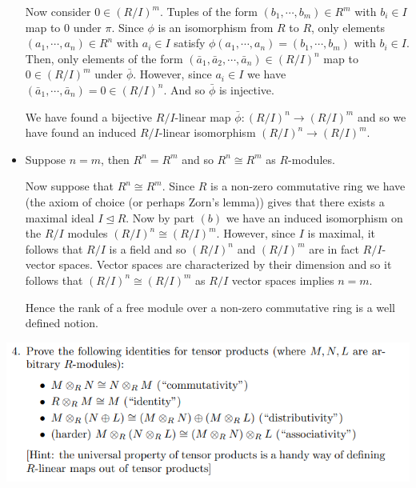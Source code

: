 \documentclass[12pt,letterpaper,boxed]{hmcpset}
\newcommand{\normal}{\unlhd} %
\begin{document}
\begin{solution}
\begin{itemize}
Now consider $0 \in (R/I)^m$. Tuples of the form $(b_1, \cdots, b_m)
\in R^m$ with $b_i \in I$ map to $0$ under $\pi$. Since $\phi$ is an
isomorphism from $R$ to $R$, only elements $(a_1, \cdots, a_n) \in
R^n$ with $a_i \in I$ satisfy $\phi(a_1, \cdots, a_n) = (b_1, \cdots,
b_m)$ with $b_i \in I$. Then, only elements of the form
$(\bar a_1, \bar a_2, \cdots, \bar a_n) \in (R/I)^n$ map to $0 \in
(R/I)^m$ under $\bar \phi$. However, since $a_i \in I$ we have 
$(\bar a_1, \cdots, \bar a_n) = 0 \in (R/I)^n$. And so $\bar \phi$ is
injective.

We have found a bijective $R/I$-linear map $\bar\phi: (R/I)^n \to
(R/I)^m$ and so we have found an induced $R/I$-linear isomorphism
$(R/I)^n \to (R/I)^m$. 

\item 
Suppose $n = m$, then $R^n = R^m$ and so $R^n \cong R^m$ as
$R$-modules.

Now suppose that $R^n \cong R^m$. Since $R$ is a non-zero commutative
ring we have (the axiom of choice (or perhaps Zorn's lemma)) gives
that there exists a maximal ideal $I \normal R$. 
Now by part $(b)$ we have an induced isomorphism on the $R/I$ modules
$(R/I)^n \cong (R/I)^m$. However, since $I$ is maximal, it follows
that $R/I$ is a field and so $(R/I)^n$ and $(R/I)^m$ are in fact
$R/I$-vector spaces. Vector spaces are characterized by their
dimension and so it follows that $(R/I)^n \cong (R/I)^m$ as $R/I$
vector spaces implies $n = m$. 

Hence the rank of a free module over a non-zero commutative ring is a
well defined notion. 

\end{itemize}
\end{solution}

\newpage


\begin{problem}
	\includegraphics[scale=0.8]{4.png}
	\hfill
\end{problem}
\end{document}
